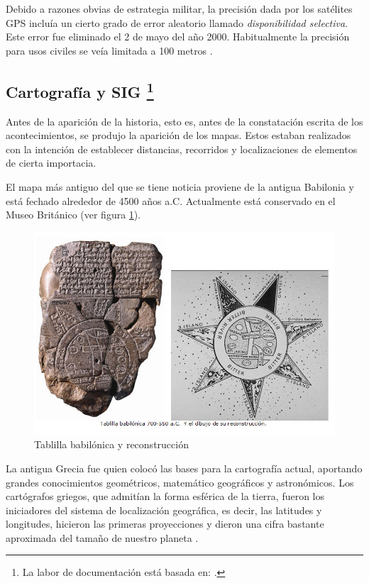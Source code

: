 Debido a razones obvias de estrategia militar, la precisión dada por los satélites \ac{GPS} incluía un cierto grado de error aleatorio llamado \textit{disponibilidad selectiva}. Este error fue eliminado el 2 de mayo del año 2000. Habitualmente la precisión para usos civiles se veía limitada a 100 metros \cite{Corr00}.

\subsection{Cartografía y \acs{SIG} \protect\footnote{La labor de documentación está basada en: \cite{Diaz15}.} }

Antes de la aparición de la historia, esto es, antes de la constatación escrita de los acontecimientos, se produjo la aparición de los mapas. Estos estaban realizados con la intención de establecer distancias, recorridos y localizaciones de elementos de cierta importacia.

El mapa más antiguo del que se tiene noticia proviene de la antigua Babilonia y está fechado alrededor de 4500 años a.C. Actualmente está conservado en el Museo Británico (ver figura \ref{fig:mapa-babilonio}).

\begin{figure}[h!btp]
\centering
\includegraphics[scale=0.5, fbox={\fboxrule} 0mm]{images/03-antecedentes/32-mapa_babilonio.jpg}
\caption{Tablilla babilónica y reconstrucción}
\label{fig:mapa-babilonio}
\end{figure}

La antigua Grecia fue quien colocó las bases para la cartografía actual, aportando grandes conocimientos geométricos, matemático geográficos y  astronómicos. Los cartógrafos griegos, que admitían la forma esférica de la tierra, fueron los iniciadores del sistema de localización geográfica, es decir, las latitudes y longitudes, hicieron las primeras proyecciones \cite{Schl07} y dieron una cifra bastante aproximada del tamaño de nuestro planeta \cite{Aup09}.

